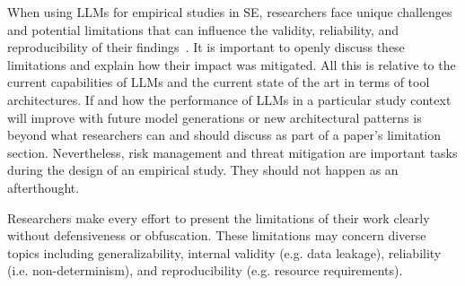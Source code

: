 When using LLMs for empirical studies in SE, researchers face unique challenges and potential limitations that can influence the validity, reliability, and reproducibility of their findings~\cite{sallou2024breaking}.
It is important to openly discuss these limitations and explain how their impact was mitigated.
All this is relative to the current capabilities of LLMs and the current state of the art in terms of tool architectures.
If and how the performance of LLMs in a particular study context will improve with future model generations or new architectural patterns is beyond what researchers can and should discuss as part of a paper's limitation section.
Nevertheless, risk management and threat mitigation are important tasks during the design of an empirical study.
They should not happen as an afterthought.



Researchers \must make every effort to present the limitations of their work clearly 
without defensiveness or obfuscation. These limitations may concern diverse topics including generalizability, internal validity (e.g. data leakage), reliability (i.e. non-determinism), and reproducibility (e.g. resource requirements). 

